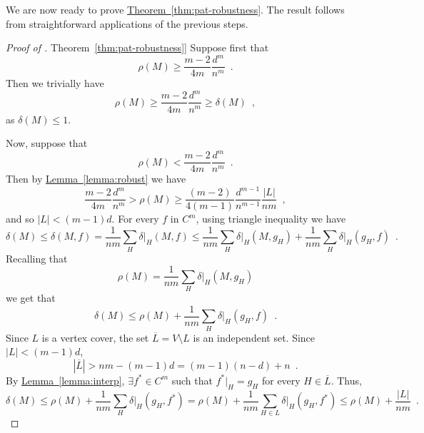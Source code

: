 \documentclass[11pt]{article}
\numberwithin{equation}{section}
\theoremstyle{definition}
\theoremstyle{plain}
\newcommand{\expref}[2]{\hyperref[#2]{#1~\ref{#2}}}
\theoremstyle{plain}
\newcommand{\colored}{}
\newcommand{\reldist}{\colored{\delta}}
\newcommand{\robust}{\colored{\rho}} %
\newcommand{\plane}{{\colored{H}}} %
\newcommand{\codedist}{\colored{d}} %
\newcommand{\blocklength}{\colored{n}} %
\newcommand{\testerinput}{\colored{M}} %
\newcommand{\closestlocalword}[1]{ \colored{g_{#1}}} %
\newcommand{\closestglobalword}{\colored{f}} %
\newcommand\abs[1]{\colored{\left|#1\right|}}
\begin{document}
We are now ready to prove \expref{Theorem}{thm:pat-robustness}. The result follows from straightforward applications of the previous steps.
\begin{proof}[Proof of \expref{Theorem}{thm:pat-robustness}]
  Suppose first that
  \[
    \robust(\testerinput) \geq \frac{m-2}{4m} \frac{\codedist^m}{\blocklength^m}\enspace.
  \]
  Then we trivially have
  \[
    \robust(\testerinput) \geq \frac{m-2}{4m} \frac{\codedist^m}{\blocklength^m} \geq \reldist(\testerinput)\enspace,
  \]
  as $\reldist(\testerinput) \leq 1$.

  Now, suppose that
  \[
    \robust(\testerinput) < \frac{m-2}{4m} \frac{\codedist^m}{\blocklength^m}\enspace.
  \]
  Then by \expref{Lemma}{lemma:robust} we have
\begin{equation*}
\frac{m-2}{4m} \frac{\codedist^m}{\blocklength^m} > \robust(\testerinput) \geq  \frac{(m-2)}{4 (m-1)} \frac{\codedist^{m-1}}{\blocklength^{m-1}} \frac{\abs{L}}{\blocklength m} \enspace,
\end{equation*}
and so $\abs{L} < (m-1)\codedist$.
For every $\closestglobalword$ in $C^m$, using triangle inequality we have
\begin{equation*}
\reldist(\testerinput) \leq \reldist(\testerinput, \closestglobalword) = \frac{1}{\blocklength m} \sum_{\plane} \reldist \vert_{\plane} (\testerinput, \closestglobalword) \leq \frac{1}{\blocklength m} \sum_{\plane} \reldist \vert_{\plane}(\testerinput, \closestlocalword{\plane}) + \frac{1}{\blocklength m} \sum_{\plane} \reldist \vert_{\plane}(\closestlocalword{\plane}, \closestglobalword) \enspace.
\end{equation*}
Recalling that
\[
  \rho(M) = \frac{1}{\blocklength m} \sum_{\plane} \reldist \vert_{\plane}(\testerinput, \closestlocalword{\plane})
\]
we get that
\begin{equation*}
\reldist(\testerinput) \leq \robust(\testerinput) + \frac{1}{\blocklength m} \sum_{\plane} \reldist \vert_{\plane}(\closestlocalword{\plane}, \closestglobalword) \enspace.
\end{equation*}
Since $L$ is a vertex cover, the set $\overline{L} = V \setminus L$ is an independent set. Since $\abs{L} < (m-1)\codedist$,
\[
  \abs{\overline{L}} > \blocklength m - (m-1)\codedist = (m-1)(\blocklength-\codedist) + \blocklength\enspace.
\]
By \expref{Lemma}{lemma:interp}, $\exists f^* \in C^m$ such that
$f^* \vert_{\plane} = \closestlocalword{\plane}$ for every
$\plane \in \overline{L}$. Thus,
\begin{equation*}
\reldist(\testerinput) \leq \robust(\testerinput) + \frac{1}{\blocklength m} \sum_{\plane} \reldist \vert_{\plane}(\closestlocalword{\plane}, f^*) = \robust(\testerinput) + \frac{1}{\blocklength m} \sum_{\plane \in L} \reldist \vert_{\plane}(\closestlocalword{\plane}, f^*) \leq \robust(\testerinput) + \frac{\abs{L}}{\blocklength m} \enspace.

\end{equation*}
\end{proof}
\end{document}
